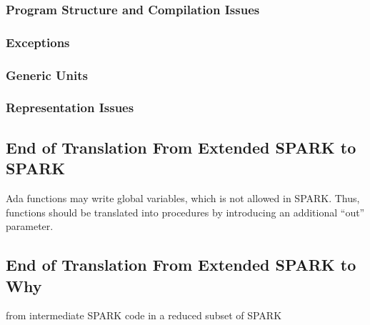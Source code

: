 \documentclass[fullpage]{article}
\begin{document}
\subsubsection{Program Structure and Compilation Issues}

\subsubsection{Exceptions}

\subsubsection{Generic Units}

\subsubsection{Representation Issues}

\subsection{End of Translation From Extended SPARK to SPARK}

Ada functions may write global variables, which is not allowed in SPARK. Thus,
functions should be translated into procedures by introducing an additional
``out'' parameter.

\subsection{End of Translation From Extended SPARK to Why}

from intermediate SPARK code in a reduced subset of SPARK
\end{document}
